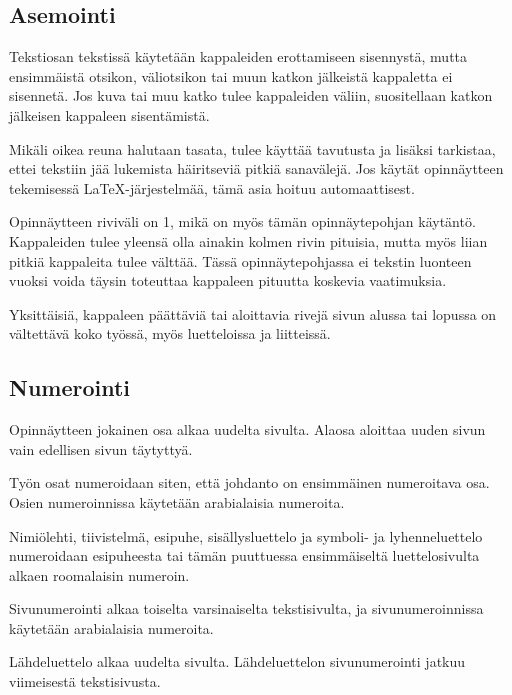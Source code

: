 \documentclass[finnish, 12pt, a4paper, sci, utf8, pdfa]{aaltothesis}
\begin{document}
\subsection*{Asemointi}

Tekstiosan tekstissä käytetään kappaleiden erottamiseen sisennystä,
mutta ensimmäistä otsikon, väliotsikon tai muun katkon jälkeistä
kappaletta ei sisennetä. Jos kuva tai muu katko tulee kappaleiden
väliin, suositellaan katkon jälkeisen kappaleen sisentämistä.

Mikäli oikea reuna halutaan tasata, tulee käyttää tavutusta ja lisäksi
tarkistaa, ettei tekstiin jää lukemista häiritseviä pitkiä sanavälejä. Jos
käytät opinnäytteen tekemisessä \LaTeX-järjestelmää, 
tämä asia hoituu automaattisest.

Opinnäytteen riviväli on 1, mikä on myös tämän opinnäytepohjan käytäntö. 
Kappaleiden tulee yleensä olla ainakin kolmen rivin pituisia, mutta
myös liian pitkiä kappaleita tulee välttää.  Tässä opinnäytepohjassa
ei tekstin luonteen vuoksi voida täysin toteuttaa kappaleen pituutta koskevia
vaatimuksia.

Yksittäisiä, kappaleen päättäviä tai aloittavia rivejä sivun alussa
tai lopussa on vältettävä koko työssä, myös luetteloissa ja
liitteissä.

\subsection*{Numerointi}

Opinnäytteen jokainen osa alkaa uudelta sivulta. Alaosa aloittaa uuden
sivun vain edellisen sivun täytyttyä.

Työn osat numeroidaan siten, että johdanto on ensimmäinen numeroitava
osa. Osien numeroinnissa käytetään arabialaisia numeroita.

Nimiölehti, tiivistelmä, esipuhe, sisällysluettelo ja symboli- ja
lyhenneluettelo numeroidaan esipuheesta tai tämän puuttuessa 
ensimmäiseltä luettelosivulta alkaen roomalaisin numeroin.

Sivunumerointi alkaa toiselta varsinaiselta tekstisivulta, ja 
sivunumeroinnissa käytetään arabialaisia numeroita.

Lähdeluettelo alkaa uudelta sivulta. Lähdeluettelon sivunumerointi 
jatkuu viimeisestä tekstisivusta.
\end{document}
